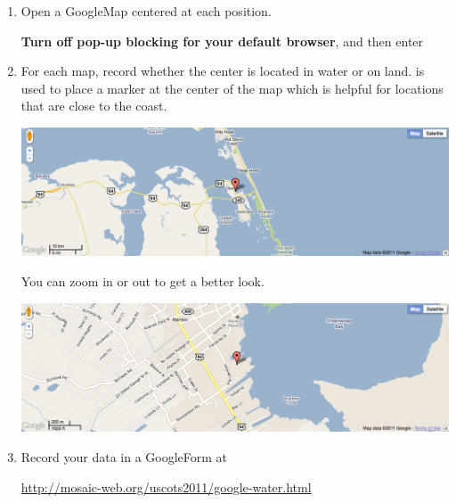\begin{enumerate}
\item
Open a GoogleMap centered at each position.

\textbf{Turn off pop-up blocking for your default browser}, and then enter

\begin{knitrout}
\end{knitrout}


\item
For each map, record whether the center is located in water or on land.  
is used to place a marker at the center of the map which is helpful for locations that are close to 
the coast.  
\begin{center}
\includegraphics[width=.8\textwidth]{images/google-water1}
\end{center}
You can zoom in or out to get a better look.
\begin{center}
\includegraphics[width=.8\textwidth]{images/google-water2}
\end{center}


\item
Record your data in a GoogleForm at 

\begin{center}
\url{http://mosaic-web.org/uscots2011/google-water.html}


\end{center}
\end{enumerate}
